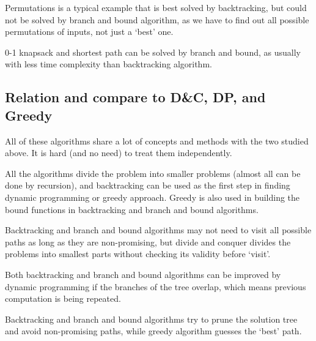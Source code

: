 \documentclass[natbib,12pt]{article}
\begin{document}
Permutations is a typical example that is best solved by backtracking, but could not be solved by branch and bound algorithm, as we have to find out all possible permutations of inputs, not just a `best' one.

0-1 knapsack and shortest path can be solved by branch and bound, as usually with less time complexity than backtracking algorithm.

\subsection{Relation and compare to D\&C, DP, and Greedy}

All of these algorithms share a lot of concepts and methods with the two studied above. It is hard (and no need) to treat them independently. 

All the algorithms divide the problem into smaller problems (almost all can be done by recursion), and backtracking can be used as the first step in finding dynamic programming or greedy approach. Greedy is also used in building the bound functions in backtracking and branch and bound algorithms.

Backtracking and branch and bound algorithms may not need to visit all possible paths as long as they are non-promising, but divide and conquer divides the problems into smallest parts without checking its validity before `visit'. 

Both backtracking and branch and bound algorithms can be improved by dynamic programming if the branches of the tree overlap, which means previous computation is being repeated.

Backtracking and branch and bound algorithms try to prune the solution tree and avoid non-promising paths, while greedy algorithm guesses the `best' path.
\end{document}
